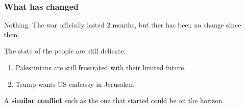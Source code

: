 \subsubsection{What has changed} 

Nothing. The war officially lasted 2 months, but ther has been no change since then.

The state of the people are still delicate. 
\begin{enumerate}
	\item Palestinians are still frustrated with their limited future.
	\item Trump wants US embassy in Jerusalem.
\end{enumerate}

A \textbf{similar conflict} such as the one that started could be on the horizon.


